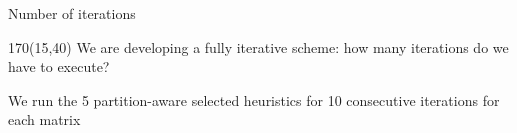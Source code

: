 \begin{frame}{Number of iterations}
	\begin{textblock}{170}(15,40)
		We are developing a fully iterative scheme: how many iterations do we have to execute?

		We run the 5 partition-aware selected heuristics for 10 consecutive iterations for each matrix

	\end{textblock}

\end{frame}

